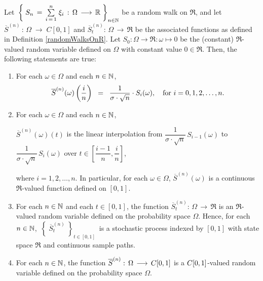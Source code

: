 \begin{theorem}
\label{LinearInterpolationOfRandomWalkIsCzoValuedRandomVariable}
\mbox{}\vskip 0.2cm
\noindent
Let \,$\left\{\;S_{n} \,=\, \overset{n}{\underset{i\,=\,1}{\sum}}\;\xi_{i} \,:\, \Omega \,\longrightarrow\, \mathbb{R}\;\right\}_{n\in\mathbb{N}}$
be a random walk on $\Re$, and let
$\overline{S}^{(n)} \,:\, \Omega \;\longrightarrow\;C[0,1]$ and
$\overline{S}^{(n)}_{t} : \,\Omega \, \longrightarrow \, \Re$
be the associated functions as defined in Definition \ref{randomWalksOnR}.
Let $S_{0} : \Omega \longrightarrow \Re : \omega \longmapsto 0$ be the (constant) $\Re$-valued random
variable defined on $\Omega$ with constant value $0 \in \Re$. 
Then, the following statements are true:
\begin{enumerate}
\item	For each $\omega \in \Omega$ and each $n \in \mathbb{N}$,
		\begin{equation*}
		\overline{S}^{(n)}(\omega)\left(\dfrac{i}{n}\right) \;\; = \;\; \dfrac{1}{\sigma\cdot\sqrt{n}}\cdot S_{i}(\omega),
		\quad
		\textnormal{for $i = 0, 1, 2, \ldots, n$}.
		\end{equation*}
\item	For each $\omega \in \Omega$ and each $n \in \mathbb{N}$, 
		\begin{center}
		$\overline{S}^{(n)}(\omega)(t)$\; is the linear interpolation
		from \;$\dfrac{1}{\sigma\cdot\sqrt{n}}\,S_{i-1}(\omega)$\;
		to \;$\dfrac{1}{\sigma\cdot\sqrt{n}}\,S_{i}(\omega)$\;
		over \;$t \in \left[\dfrac{i-1}{n},\dfrac{i}{n}\right]$,
		\end{center}
		where $i = 1, 2, \ldots, n$.
		In particular, for each $\omega \in \Omega$,
		$\overline{S}^{(n)}(\omega)$ is a continuous $\Re$-valued function defined on $[0,1]$.
\item	For each $n \in \mathbb{N}$ and each $t \in [0,1]$, the function
		\;$\overline{S}^{(n)}_{t} : \,\Omega \, \longrightarrow \, \Re$\;
		is an $\Re$-valued random variable defined on the probability space $\Omega$.
		Hence, for each $n \in \mathbb{N}$, \,$\left\{\;\overline{S}^{(n)}_{t}\;\right\}_{t\in[0,1]}$\,
		is a stochastic process indexed by $[0,1]$ with state space $\Re$
		and continuous sample paths.
\item	For each $n \in \mathbb{N}$, the function
		\;$\overline{S}^{(n)} : \,\Omega \, \longrightarrow \, C[0,1]$\;
		is a $C[0,1]$-valued random variable defined on the probability space $\Omega$.
\end{enumerate}
\end{theorem}
\proof
